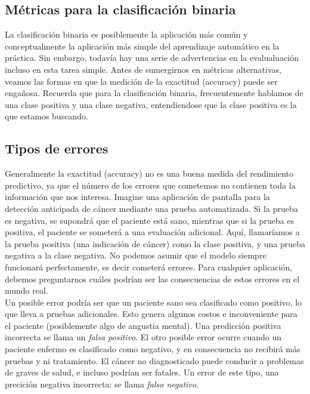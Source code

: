 {\subsection{Métricas para la clasificación binaria}

La clasificación binaria es posiblemente la aplicación más común y conceptualmente la aplicación más simple del aprendizaje automático en la práctica.  Sin embargo, todavía hay una serie de advertencias en la evalualuación incluso en esta  tarea simple.   Antes de sumergirnos en métricas alternativas, veamos  las formas en que la medición de la exactitud (accuracy) puede ser engañosa. Recuerda que para la clasificación binaria, frecuentemente  hablamos de una clase positiva y una clase negativa,  entendiendose que la clase positiva es la que estamos buscando.


\subsection{Tipos de errores}

Generalmente  la exactitud (accuracy) no es una buena medida del rendimiento predictivo, ya que el número de
los errores que cometemos no contienen toda la información que nos interesa. Imagine
una aplicación de pantalla para la detección anticipada de cáncer mediante una prueba automatizada. 
Si la prueba es negativa, se supondrá que el paciente está sano, mientras que si la prueba es positiva, 
el paciente se someterá a una evaluación adicional.   Aquí, llamaríamos a la prueba positiva 
(una indicación  de cáncer) como la clase positiva, y una prueba negativa a la clase negativa. No podemos
asumir que el modelo siempre funcionará perfectamente, es decir cometerá errores. Para cualquier
aplicación, debemos preguntarnos cuáles podrían ser las consecuencias de estos errores 
en el mundo real.\\

Un posible error podría ser que  un paciente sano sea clasificado como positivo, lo que lleva a
pruebas adicionales.  Esto genera  algunos costos e inconveniente para el paciente (posiblemente algo de angustia mental).  Una predicción positiva incorrecta se llama un \emph{falsa positivo}. El otro posible error ocurre cuando un paciente enfermo es clasificado como negativo, y en consecuencia no recibirá más pruebas y ni tratamiento. El cáncer no diagnosticado puede conducir a problemas de  graves de salud, e incluso podrían ser fatales.   Un error de este tipo, una precición   negativa  incorrecta: se llama  \emph{falso negativo}.   

}
